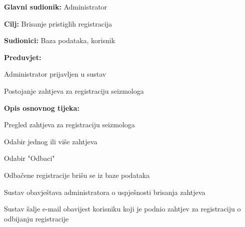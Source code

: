 					\noindent {}
					\begin{packed_item}
	
						\item \textbf{Glavni sudionik:} Administrator
						\item \textbf{Cilj:} Brisanje pristiglih registracija
						\item \textbf{Sudionici:} Baza podataka, korisnik
						\item \textbf{Preduvjet:} 
							\begin{packed_item}
								\item Administrator prijavljen u sustav
								\item Postojanje zahtjeva za registraciju seizmologa
							\end{packed_item}
						\item  \textbf{Opis osnovnog tijeka:}
						
						\item[] \begin{packed_enum}
	
							\item Pregled zahtjeva za registraciju seizmologa
							\item Odabir jednog ili više zahtjeva
							\item Odabir "Odbaci"
							\item Odbačene registracije brišu se iz baze podataka
							\item Sustav obavještava administratora o uspješnosti brisanja zahtjeva
							\item Sustav šalje e-mail obavijest korisniku koji je podnio zahtjev za registraciju o odbijanju registracije
							
						\end{packed_enum}
					\end{packed_item}

